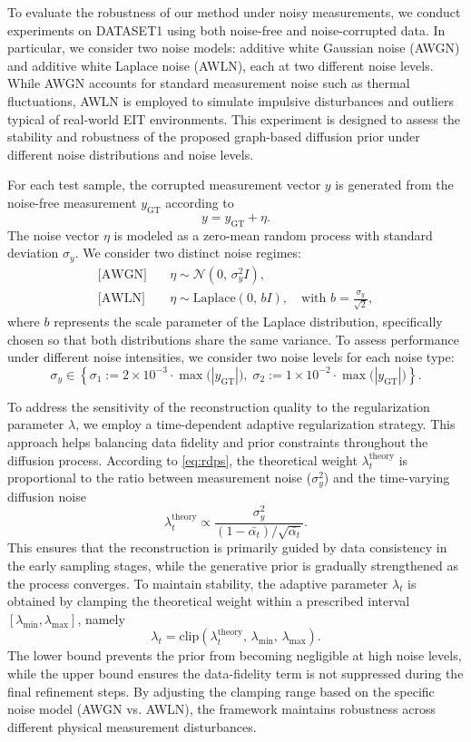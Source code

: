 \documentclass[a4paper,11pt]{article}
\theoremstyle{definition}
\theoremstyle{plain}
\theoremstyle{remark}
\begin{document}
To evaluate the robustness of our method under noisy measurements, we conduct experiments on DATASET1 using both noise-free and noise-corrupted data. In particular, we consider two noise models: additive white Gaussian noise (AWGN) and additive white Laplace noise (AWLN), each at two different noise levels. While AWGN accounts for standard measurement noise such as thermal fluctuations, AWLN is employed to simulate impulsive disturbances and outliers typical of real-world EIT environments. This experiment is designed to assess the stability and robustness of the proposed graph-based diffusion prior under different noise distributions and noise levels.

For each test sample, the corrupted measurement vector $y$ is generated from the noise-free measurement $y_{\mathrm{GT}}$ according to
\[
y = y_{\mathrm{GT}} + \eta.
\]
The noise vector $\eta$ is modeled as a zero-mean random process with standard deviation $\sigma_y$. We consider two distinct noise regimes:
\begin{eqnarray}
\text{[AWGN]} \quad & \eta \sim \mathcal{N}\!\left(0,\,\sigma_y^2 I\right), \\
\text{[AWLN]} \quad & \eta \sim \mathrm{Laplace}(0,\, b I), \quad \text{with } b = \frac{\sigma_y}{\sqrt{2}},
\end{eqnarray}
where $b$ represents the scale parameter of the Laplace distribution, specifically chosen so that both distributions share the same variance.
To assess performance under different noise intensities, we consider two noise levels for each noise type:
\begin{equation}
\label{eq:nl}
\sigma_y \in \left\{\sigma_1 := 2\times10^{-3}\cdot \max\bigl(|y_{\mathrm{GT}}|\bigr),\; \sigma_2 := 1\times10^{-2}\cdot \max\bigl(|y_{\mathrm{GT}}|\bigr)\right\}.
\end{equation}


To address the sensitivity of the reconstruction quality to the regularization parameter $\lambda$, we employ a time-dependent adaptive regularization strategy. This approach helps balancing data fidelity and prior constraints throughout the diffusion process.
According to \eqref{eq:rdps}, the theoretical weight $\lambda_t^{\mathrm{theory}}$ is proportional to the ratio between measurement noise ($\sigma_y^2$) and the time-varying diffusion noise
\[
\lambda_t^{\mathrm{theory}}
\propto \frac{\sigma_y^2}{(1-\bar{\alpha_t})/ \sqrt{\bar{\alpha_t}}}.
\] This ensures that the reconstruction is primarily guided by data consistency in the early sampling stages, while the generative prior is gradually strengthened as the process converges. To maintain stability, the adaptive parameter $\lambda_t$ is obtained by clamping the theoretical weight within a prescribed interval $[\lambda_{\min}, \lambda_{\max}]$, namely
\[
\lambda_t = \mathrm{clip}\!\left(\lambda_t^{\mathrm{theory}},\, \lambda_{\min},\, \lambda_{\max}\right).
\]
The lower bound prevents the prior from becoming negligible at high noise levels, while the upper bound ensures the data-fidelity term is not suppressed during the final refinement steps.  By adjusting the clamping range based on the specific noise model (AWGN vs. AWLN), the framework maintains robustness across different physical measurement disturbances.
\end{document}
